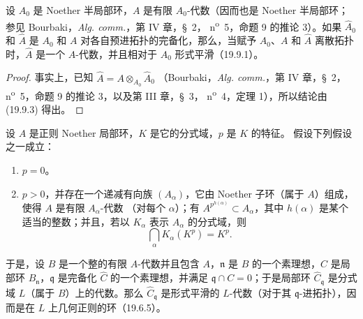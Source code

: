 \begin{lemma}[22.3.1]
\label{0.22.3.1-fr}
设 $A_0$ 是 Noether 半局部环，$A$ 是有限 $A_0$-代数（因而也是 Noether
半局部环；参见 Bourbaki，\emph{Alg. comm.}，第 IV 章，§~2，
n\textsuperscript{o}~5，命题 9 的推论 3）。如果 $\widehat A_0$ 和
$\widehat A$ 是 $A_0$ 和 $A$ 对各自预进拓扑的完备化，那么，当赋予
$A_0$、$A$ 和 $\widehat A$ 离散拓扑时，$\widehat A$ 是一个
$A$-代数，并且相对于 $A_0$ 形式平滑（19.9.1）。
\end{lemma}

\begin{proof}
事实上，已知
$\widehat A=A\otimes_{A_0}\widehat A_0$
（Bourbaki，\emph{Alg. comm.}，第 IV 章，§~2，
n\textsuperscript{o}~5，命题 9 的推论 3，以及第 III 章，§~3，
n\textsuperscript{o}~4，定理 1），所以结论由 (19.9.3) 得出。
\end{proof}

\begin{proposition}[22.3.2]
\label{0.22.3.2-fr}
设 $A$ 是正则 Noether 局部环，$K$ 是它的分式域，$p$ 是 $K$ 的特征。
假设下列假设之一成立：
\begin{enumerate}
  \item[(i)] $p=0$。
  \item[(ii)] $p>0$，并存在一个递减有向族 $(A_\alpha)$，它由
  Noether 子环（属于 $A$）组成，使得 $A$ 是有限 $A_\alpha$-代数
  （对每个 $\alpha$）；有 $A^{p^{h(\alpha)}}\subset A_\alpha$，其中
  $h(\alpha)$ 是某个适当的整数；并且，若以 $K_\alpha$ 表示
  $A_\alpha$ 的分式域，则
  \[
    \bigcap_\alpha K_\alpha(K^p)=K^p.
  \]
\end{enumerate}
于是，设 $B$ 是一个整的有限 $A$-代数并且包含 $A$，$\mathfrak n$ 是
$B$ 的一个素理想，$C$ 是局部环 $B_\mathfrak n$，$\mathfrak q$ 是完备化
$\widehat C$ 的一个素理想，并满足 $\mathfrak q\cap C=0$；于是局部环
$\widehat C_\mathfrak q$ 是分式域 $L$（属于 $B$）上的代数。那么
$\widehat C_\mathfrak q$ 是形式平滑的 $L$-代数（对于其
$\mathfrak q$-进拓扑），因而是在 $L$ 上几何正则的环（19.6.5）。
\end{proposition}

